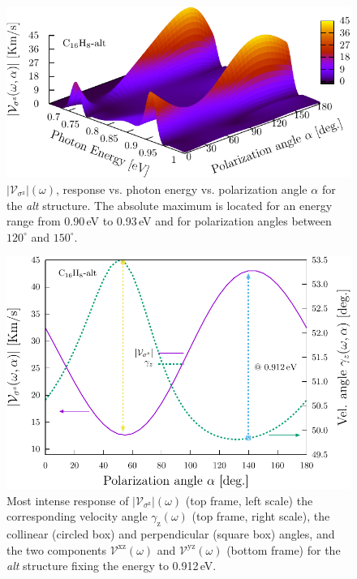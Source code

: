 \documentclass[prb,11pt,tightenlines,twocolumn,aps]{revtex4-1}
\begin{document}
\begin{figure}[tb]
    \centering
    \includegraphics[width=\linewidth]{altplots/alt-3d-svaz}
    \caption{\color{red} $|\mathcal{V}_{\sigma^{\mathrm{z}}}|(\omega)$, response
    vs. photon energy vs. polarization angle $\alpha$ for the \emph{alt}
    structure. The absolute maximum is located for an energy range from 0.90\,eV
    to 0.93\,eV and for polarization angles between $120^{\circ}$ and
    $150^{\circ}$.}
    \label{fig:alt-3d-vsb}
\end{figure}

\begin{figure}[t]
    \centering
    \includegraphics[width=\linewidth]{altplots/alt-vaz-rag}
    \caption{Most intense response of
    $|\mathcal{V}_{\sigma^{\mathrm{z}}}|(\omega)$ (top frame, left scale) the
    corresponding velocity angle $\gamma_{\mathrm{z}}(\omega)$ (top frame, right
    scale), the collinear (circled box) and perpendicular (square box) angles,
    and the two components $\mathcal{V}^{\mathrm{xz}}(\omega)$ and
    $\mathcal{V}^{\mathrm{yz}}(\omega)$ (bottom frame) for the \emph{alt}
    structure fixing the energy to 0.912\,eV.}
    \label{fig:figure1}
\end{figure}
\end{document}
